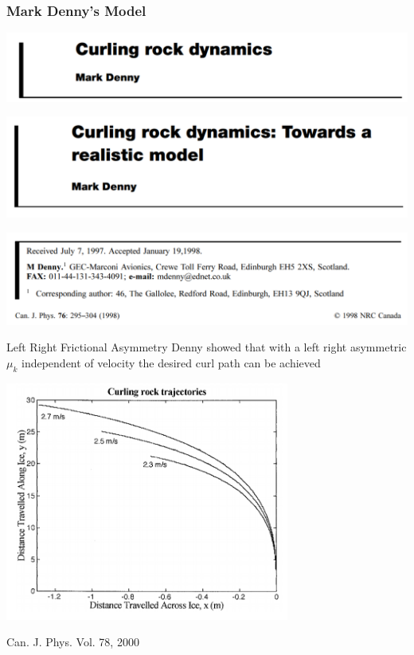 \documentclass{beamer}
\begin{document}
\begin{frame}\frametitle{Mark Denny's Model}
    \centering
    \includegraphics[width=1.0\textwidth]{Images/M_Denny_1998.png}

    \includegraphics[width=1.0\textwidth]{Images/M_Denny_2003.png}

    \includegraphics[width=1.0\textwidth]{Images/M_Denny_1998_Affl.png}
\end{frame}

\begin{frame}{Left Right Frictional Asymmetry}
    Denny showed that with a left right asymmetric $\mu_k$ independent of velocity the desired curl path can be achieved
    \begin{center}
    \includegraphics[width=0.7\textwidth]{Images/Denny_Traj.png}

    \scriptsize{Can. J. Phys. Vol. 78, 2000}
    \end{center}
\end{frame}
\end{document}
